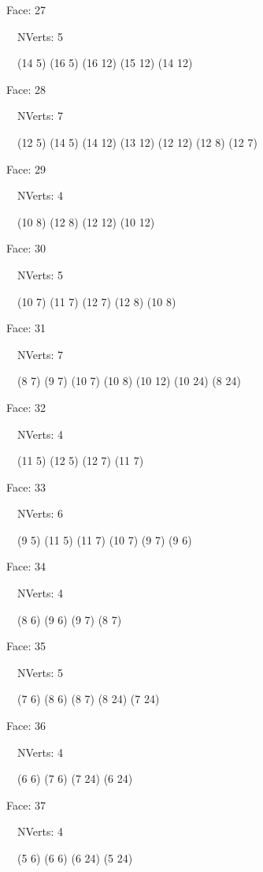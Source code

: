 \documentclass{article}
\begin{document}
{\footnotesize 

Face: 27

\   \    NVerts: 5

 \   \   (14 5) (16 5) (16 12) (15 12) (14 12)}

{\footnotesize 

Face: 28

\   \    NVerts: 7

 \   \   (12 5) (14 5) (14 12) (13 12) (12 12) (12 8) (12 7)}

{\footnotesize 

Face: 29

\   \    NVerts: 4

 \   \   (10 8) (12 8) (12 12) (10 12)}

{\footnotesize 

Face: 30

\   \    NVerts: 5

 \   \   (10 7) (11 7) (12 7) (12 8) (10 8)}

{\footnotesize 

Face: 31

\   \    NVerts: 7

 \   \   (8 7) (9 7) (10 7) (10 8) (10 12) (10 24) (8 24)}

{\footnotesize 

Face: 32

\   \    NVerts: 4

 \   \   (11 5) (12 5) (12 7) (11 7)}

{\footnotesize 

Face: 33

\   \    NVerts: 6

 \   \   (9 5) (11 5) (11 7) (10 7) (9 7) (9 6)}

{\footnotesize 

Face: 34

\   \    NVerts: 4

 \   \   (8 6) (9 6) (9 7) (8 7)}

{\footnotesize 

Face: 35

\   \    NVerts: 5

 \   \   (7 6) (8 6) (8 7) (8 24) (7 24)}

{\footnotesize 

Face: 36

\   \    NVerts: 4

 \   \   (6 6) (7 6) (7 24) (6 24)}

{\footnotesize 

Face: 37

\   \    NVerts: 4

 \   \   (5 6) (6 6) (6 24) (5 24)}
\end{document}
